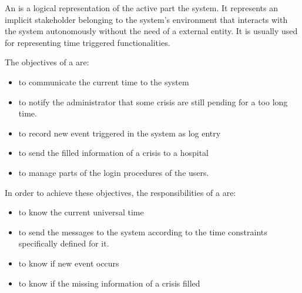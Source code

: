 An  is a logical representation of the active part the \msricrash system. It represents an implicit stakeholder belonging to the system's environment that interacts with the \msricrash system autonomously without the need of a external entity. It is usually used for representing time triggered functionalities.

The objectives of a  are:
\begin{itemize}
  \item to communicate the current time to the system
  \item to notify the administrator that some crisis are still pending for a too long time.
  \item to record new event triggered in the system as log entry
  \item to send the filled information of a crisis to a hospital
  \item to manage parts of the login procedures of the users.
\end{itemize}
\vspace{0.5cm}
In order to achieve these objectives, the responsibilities of a  are:
\begin{itemize}
  \item to know the current universal time
  \item to send the messages to the system according to the time constraints specifically defined for it.
  \item to know if new event occurs
  \item to know if the missing information of a crisis filled
\end{itemize}

